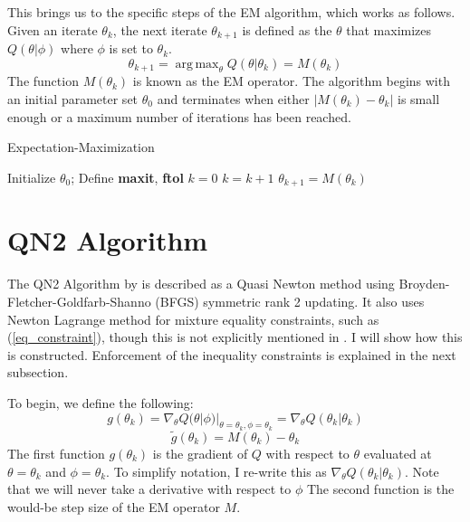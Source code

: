 \documentclass[letter,12pt]{article}
\DeclareMathOperator*{\argmax}{arg\,max}
\begin{document}
This brings us to the specific steps of the EM algorithm, which works as follows.  Given an iterate $\theta_k$, the next iterate $\theta_{k+1}$ is defined as the $\theta$ that maximizes $Q(\theta|\phi)$ where $\phi$ is set to $\theta_k$.
\[
\theta_{k+1} = \argmax_{\theta}  Q(\theta|\theta_k) = M(\theta_k)
\]
The function $M(\theta_k)$ is known as the EM operator.  The algorithm begins with an initial parameter set $\theta_0$ and terminates when either $|M(\theta_k)-\theta_k|$ is small enough or a maximum number of iterations has been reached.


\begin{algorithm}
\caption{Expectation-Maximization}
\label{em1}
\begin{algorithmic}[1]
\State Initialize $\theta_0$; Define \textbf{maxit}, \textbf{ftol}
\State $k = 0$
\State $k = k+1$
\State $\theta_{k+1} = M(\theta_k)$
\EndWhile
\end{algorithmic}
\end{algorithm}

\section{QN2 Algorithm}

The QN2 Algorithm by \cite{jamshidianj97} is described as a Quasi Newton method using Broyden-Fletcher-Goldfarb-Shanno (BFGS) symmetric rank 2 updating.  It also uses Newton Lagrange method for mixture equality constraints, such as (\ref{eq_constraint}), though this is not explicitly mentioned in \cite{jamshidianj97}.  I will show how this is constructed.  Enforcement of the inequality constraints is explained in the next subsection. 

To begin, we define the following:
\begin{equation} \label{eq:define_g}
g(\theta_k) = \nabla_{\theta}Q(\theta|\phi)|_{\theta =\theta_k, \phi = \theta_k}
= \nabla_{\theta}Q(\theta_k|\theta_k)
\end{equation}
\begin{equation} \label{eq:define_gsquiggly}
\tilde{g}(\theta_k) = M(\theta_k) - \theta_k
\end{equation}
The first function $g(\theta_k)$ is the gradient of $Q$ with respect to $\theta$ evaluated at $\theta = \theta_k$ and $\phi=\theta_k$.  To simplify notation, I re-write this as $\nabla_{\theta}Q(\theta_k|\theta_k)$.  Note that we will never take a derivative with respect to $\phi$ The second function is the would-be step size of the EM operator $M$.   
\end{document}
